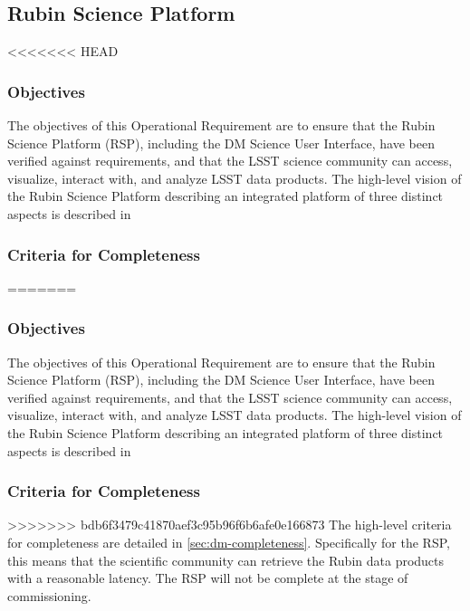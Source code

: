 \subsection{Rubin Science Platform}

<<<<<<< HEAD
\subsubsection{Objectives} 
The objectives of this Operational Requirement are to ensure that the Rubin Science Platform (RSP), including the DM Science User Interface, have been verified against requirements, and that the LSST science community can access, visualize, interact with, and analyze LSST data products. 
The high-level vision of the Rubin Science Platform describing an integrated platform of three distinct aspects is described in 

\subsubsection{Criteria for Completeness}

=======

\subsubsection{Objectives} 
The objectives of this Operational Requirement are to ensure that the Rubin Science Platform (RSP), including the DM Science User Interface, have been verified against requirements, and that the LSST science community can access, visualize, interact with, and analyze LSST data products. 
The high-level vision of the Rubin Science Platform describing an integrated platform of three distinct aspects is described in 

\subsubsection{Criteria for Completeness}
>>>>>>> bdb6f3479c41870aef3c95b96f6b6afe0e166873
The high-level criteria for completeness are detailed in \ref{sec:dm-completeness}. Specifically for the RSP, this means that the scientific community can retrieve the Rubin data products with a reasonable latency. The RSP will not be complete at the stage of commissioning. 

